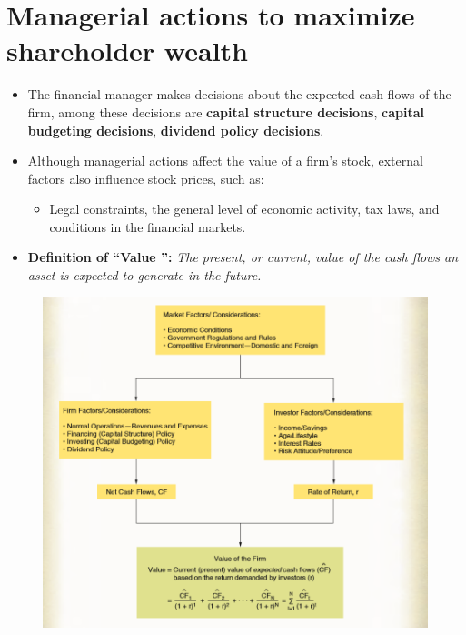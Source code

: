 \documentclass{article}
\renewcommand{\termdefinition}[2]{
    \textbf{Definition of ``#1'':} \emph{#2}
}
\begin{document}
\section{Managerial actions to maximize shareholder wealth}
\begin{itemize}
    \item The financial manager makes decisions about the expected cash flows of the firm, among these decisions are \textbf{capital structure decisions}, \textbf{capital budgeting decisions}, \textbf{dividend policy decisions}.

    \item Although managerial actions affect the value of a firm’s stock, external factors also influence stock prices, such as: 
        \begin{itemize}
            \item Legal constraints, the general level of economic activity, tax laws, and conditions in the financial markets.
        \end{itemize}
    
    \item \termdefinition{Value }{ The present, or current, value of the cash flows an asset is expected to generate in the future.} 
\end{itemize}
\begin{figure}[H]
    \centering
    \includegraphics[width=\textwidth]{value} 
\end{figure}
\end{document}
